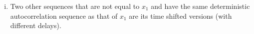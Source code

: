 \begin{enumerate}[(a)]
\begin{enumerate}[i.]
	\item Two other sequences that are not equal to $x_1$ and have the same deterministic autocorrelation sequence as that of $x_1$ are its time shifted versions (with different delays).
\end{enumerate}
\end{enumerate}